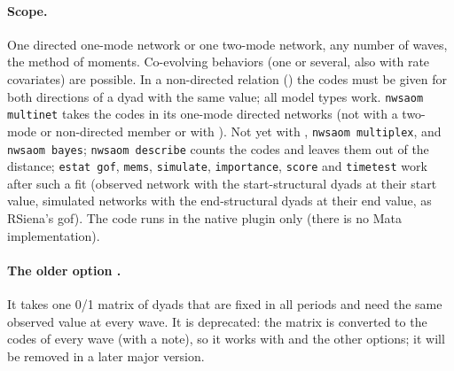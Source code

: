 \paragraph{Scope.} One directed one-mode network or one two-mode network, any number of waves, the method of moments. Co-evolving behaviors (one or several, also with rate covariates) are possible. In a non-directed relation () the codes must be given for both directions of a dyad with the same value; all model types work. \texttt{nwsaom multinet} takes the codes in its one-mode directed networks (not with a two-mode or non-directed member or with ). Not yet with , \texttt{nwsaom multiplex},  and \texttt{nwsaom bayes}; \texttt{nwsaom describe} counts the codes and leaves them out of the distance; \texttt{estat gof}, \texttt{mems}, \texttt{simulate}, \texttt{importance}, \texttt{score} and \texttt{timetest} work after such a fit (observed network with the start-structural dyads at their start value, simulated networks with the end-structural dyads at their end value, as RSiena's gof). The code runs in the native plugin only (there is no Mata implementation).

\paragraph{The older option .} It takes one 0/1 matrix of dyads that are fixed in all periods and need the same observed value at every wave. It is deprecated: the matrix is converted to the codes of every wave (with a note), so it works with  and the other options; it will be removed in a later major version.

